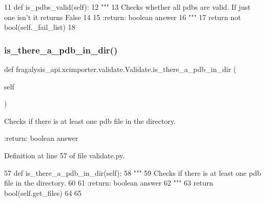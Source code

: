 \begin{DoxyCode}
11     \textcolor{keyword}{def }is\_pdbs\_valid(self):
12         \textcolor{stringliteral}{"""}
13 \textcolor{stringliteral}{        Checks whether all pdbs are valid. If just one isn't it returns False}
14 \textcolor{stringliteral}{}
15 \textcolor{stringliteral}{        :return: boolean answer}
16 \textcolor{stringliteral}{        """}
17         \textcolor{keywordflow}{return} \textcolor{keywordflow}{not} bool(self.\_fail\_list)
18 
\end{DoxyCode}
\mbox{\label{classfragalysis__api_1_1xcimporter_1_1validate_1_1_validate_a7203bedad575f779345a78f7880a58a2}} 
\subsubsection{\texorpdfstring{is\+\_\+there\+\_\+a\+\_\+pdb\+\_\+in\+\_\+dir()}{is\_there\_a\_pdb\_in\_dir()}}
{\footnotesize\ttfamily def fragalysis\+\_\+api.\+xcimporter.\+validate.\+Validate.\+is\+\_\+there\+\_\+a\+\_\+pdb\+\_\+in\+\_\+dir (\begin{DoxyParamCaption}\item[{}]{self }\end{DoxyParamCaption})}

\begin{DoxyVerb}Checks if there is at least one pdb file in the directory.

:return: boolean answer
\end{DoxyVerb}
 

Definition at line 57 of file validate.\+py.


\begin{DoxyCode}
57     \textcolor{keyword}{def }is\_there\_a\_pdb\_in\_dir(self):
58         \textcolor{stringliteral}{"""}
59 \textcolor{stringliteral}{        Checks if there is at least one pdb file in the directory.}
60 \textcolor{stringliteral}{}
61 \textcolor{stringliteral}{        :return: boolean answer}
62 \textcolor{stringliteral}{        """}
63         \textcolor{keywordflow}{return} bool(self.get\_files)
64 
65 
\end{DoxyCode}
\mbox{\label{classfragalysis__api_1_1xcimporter_1_1validate_1_1_validate_a1e2236300274a3e4c91944ff8a10f432}} 
